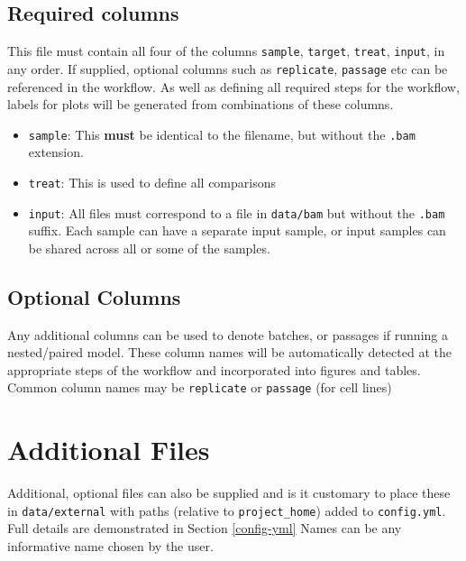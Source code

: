 \documentclass[
]{book}
\providecommand{\tightlist}{%
  \setlength{\itemsep}{0pt}\setlength{\parskip}{0pt}}
\begin{document}
\hypertarget{required-columns}{%
\subsection{Required columns}\label{required-columns}}

This file must contain all four of the columns \texttt{sample}, \texttt{target}, \texttt{treat}, \texttt{input}, in any order.
If supplied, optional columns such as \texttt{replicate}, \texttt{passage} etc can be referenced in the workflow.
As well as defining all required steps for the workflow, labels for plots will be generated from combinations of these columns.

\begin{itemize}
\tightlist
\item
  \texttt{sample}: This \textbf{must} be identical to the filename, but without the \texttt{.bam} extension.
\item
  \texttt{treat}: This is used to define all comparisons
\item
  \texttt{input}: All files must correspond to a file in \texttt{data/bam} but without the \texttt{.bam} suffix. Each sample can have a separate input sample, or input samples can be shared across all or some of the samples.
\end{itemize}

\hypertarget{optional-columns}{%
\subsection{Optional Columns}\label{optional-columns}}

Any additional columns can be used to denote batches, or passages if running a nested/paired model.
These column names will be automatically detected at the appropriate steps of the workflow and incorporated into figures and tables.
Common column names may be \texttt{replicate} or \texttt{passage} (for cell lines)

\hypertarget{additional-files}{%
\section{Additional Files}\label{additional-files}}

Additional, optional files can also be supplied and is it customary to place these in \texttt{data/external} with paths (relative to \texttt{project\_home}) added to \texttt{config.yml}.
Full details are demonstrated in Section \ref{config-yml}
Names can be any informative name chosen by the user.
\end{document}
